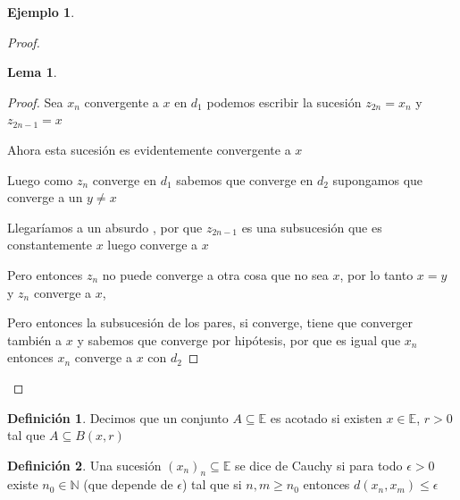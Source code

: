 \documentclass[12pt]{article}
\newcommand{\E}{\mathbb{E}}
\newcommand{\N}{\mathbb{N}}
\theoremstyle{definition}
\newtheorem{definition}{Definición}[section]
\newtheorem{lemma}[theorem]{Lema}
\newtheorem{ex}{Ejemplo}
\begin{document}
\begin{ex}
\begin{proof}
\begin{lemma}
  \begin{proof}

Sea $x_n$ convergente a $x$ en $d_1$ podemos escribir la sucesión $z_{2n} = x_n $ y $z_{2n -1} = x$ 

Ahora esta sucesión es evidentemente convergente a $x$

Luego como $z_n$ converge en $d_1$ sabemos que converge en $d_2$ supongamos que converge a un $y \neq x$

Llegaríamos a un absurdo , por que $z_{2n-1}$ es una subsucesión que es constantemente $x$ luego converge a $x$ 

Pero entonces $z_n$ no puede converge a otra cosa que no sea $x$, por lo tanto $x = y$ y $z_n$ converge a $x$, 

\noindent Pero entonces la subsucesión de los pares, si converge, tiene que converger también a $x$ y sabemos que converge por hipótesis, por que es igual que $x_n$ entonces $x_n$ converge a $x$ con $d_2$
\end{proof}
\end{lemma}
  \end{proof}

\end{ex}



\begin{definition}
  Decimos que un conjunto $A \subseteq \E$ es acotado si existen $x \in \E$, $r>0$ tal que $A \subseteq B(x,r)$
\end{definition}

\begin{definition}
  Una sucesión $(x_{n})_{n} \subseteq \E$ se dice de Cauchy si para todo $\epsilon > 0$ existe $n_{0} \in \N$ (que depende de $\epsilon$) tal que si $n,m \geq n_{0}$ entonces $d(x_{n},x_{m}) \leq \epsilon$
\end{definition}
\end{document}
